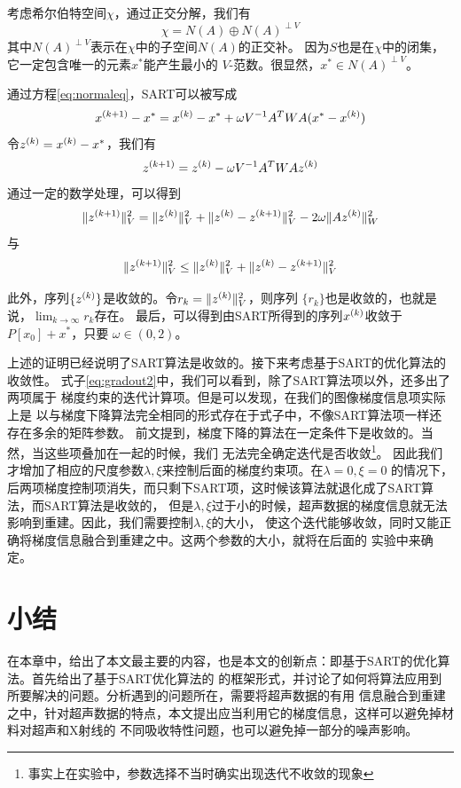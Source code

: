 考虑希尔伯特空间$\chi$，通过正交分解，我们有
\begin{equation*}
\chi = N(A)\oplus N(A)^{\perp V}
\end{equation*}
其中$N(A)^{\perp V}$表示在$\chi$中的子空间$N(A)$的正交补。
因为$S$也是在$\chi$中的闭集，它一定包含唯一的元素$x^\ast$能产生最小的
$V$-范数。很显然，$x^\ast\in N(A)^{\perp V}$。

通过方程\eqref{eq:normaleq}，SART可以被写成
\begin{equation*}
x^{(k+1)}-x^\ast = x^{(k)}-x^\ast + \omega V^{-1}A^TWA(x^\ast-x^{(k)})
\end{equation*}
令$z^{(k)}=x^{(k)}-x^\ast$，我们有
\begin{equation*}
z^{(k+1)}=z^{(k)}-\omega V^{-1}A^TWAz^{(k)}
\end{equation*}
通过一定的数学处理，可以得到
\begin{equation*}
\lVert z^{(k+1)}\rVert^2_V=\lVert z^{(k)}\rVert^2_V
+\lVert z^{(k)}-z^{(k+1)}\rVert^2_V-2\omega \lVert Az^{(k)}\rVert^2_W
\end{equation*}
与
\begin{equation*}
\lVert z^{(k+1)}\rVert^2_V\le \lVert z^{(k)}\rVert^2_V
+\lVert z^{(k)}-z^{(k+1)}\rVert^2_V
\end{equation*}

此外，序列$\{z^{(k)}\}$是收敛的。令$r_k=\lVert z^{(k)}\rVert^2_V$，则序列
$\{r_k\}$也是收敛的，也就是说，$\lim_{k\rightarrow \infty}r_k$存在。
最后，可以得到由SART所得到的序列$x^{(k)}$收敛于$P[x_0]+x^\ast$，只要
$\omega\in (0,2)$。

上述的证明已经说明了SART算法是收敛的。接下来考虑基于SART的优化算法的收敛性。
式子\eqref{eq:gradout2}中，我们可以看到，除了SART算法项以外，还多出了两项属于
梯度约束的迭代计算项。但是可以发现，在我们的图像梯度信息项实际上是
以与梯度下降算法完全相同的形式存在于式子中，不像SART算法项一样还存在多余的矩阵参数。
前文提到，梯度下降的算法在一定条件下是收敛的。当然，当这些项叠加在一起的时候，我们
无法完全确定迭代是否收敛\footnote{事实上在实验中，参数选择不当时确实出现迭代不收敛的现象}。
因此我们才增加了相应的尺度参数$\lambda,\xi$来控制后面的梯度约束项。在$\lambda=0,\xi=0$
的情况下，后两项梯度控制项消失，而只剩下SART项，这时候该算法就退化成了SART算法，而SART算法是收敛的，
但是$\lambda,\xi$过于小的时候，超声数据的梯度信息就无法影响到重建。因此，我们需要控制$\lambda,\xi$的大小，
使这个迭代能够收敛，同时又能正确将梯度信息融合到重建之中。这两个参数的大小，就将在后面的
实验中来确定。


\section{小结}
在本章中，给出了本文最主要的内容，也是本文的创新点：即基于SART的优化算法。首先给出了基于SART优化算法的
的框架形式，并讨论了如何将算法应用到所要解决的问题。分析遇到的问题所在，需要将超声数据的有用
信息融合到重建之中，针对超声数据的特点，本文提出应当利用它的梯度信息，这样可以避免掉材料对超声和X射线的
不同吸收特性问题，也可以避免掉一部分的噪声影响。

